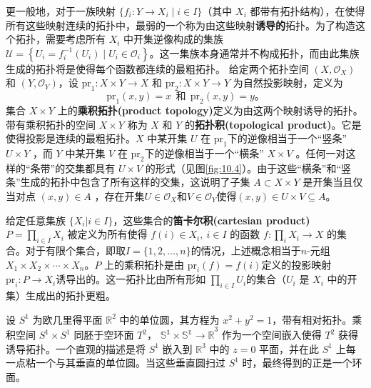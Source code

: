 	更一般地，对于一族映射 $\{f_{i} :Y\rightarrow X_{i} \mid i\in I\}$（其中 $X_{i}$ 都带有拓扑结构），在使得所有这些映射连续的拓扑中，最弱的一个称为由这些映射\textbf{诱导的}拓扑。为了构造这个拓扑，需要考虑所有 $X_{i}$ 中开集逆像构成的集族 $\mathcal{U} =\left\{U_{i} =f_{i}^{-1} (U_{i} )\mid U_{i} \in \mathcal{O}_{i}\right\}$。这一集族本身通常并不构成拓扑，而由此集族生成的拓扑将是使得每个函数都连续的最粗拓扑。
	给定两个拓扑空间 $(X,\mathcal{O}_{X} )$ 和 $(Y,\mathcal{O}_{Y} )$，设 $\mathrm{pr}_{1} :X\times Y\rightarrow X$ 和  $\mathrm{pr}_{2} :X\times Y\rightarrow Y$ 为自然投影映射，定义为
\begin{equation*}
\mathrm{pr}_{1} (x,y)=x\ \ \text{和} \ \ \mathrm{pr}_{2} (x,y)=y。
\end{equation*}
集合 $X\times Y$ 上的\textbf{乘积拓扑(product topology)}定义为由这两个映射诱导的拓扑。带有乘积拓扑的空间 $X\times Y$ 称为 $X$ 和 $Y$ 的\textbf{拓扑积(topological product)}。它是使得投影是连续的最粗拓扑。$X$ 中某开集 $U$ 在 $\mathrm{pr}_{1}$下的逆像相当于一个“竖条” $U\times Y$ ，而 $Y$ 中某开集 $V$ 在 $\mathrm{pr}_{2}$下的逆像相当于一个“横条” $X\times V$ 。任何一对这样的“条带”的交集都具有 $U\times V$ 的形式（见图\ref{fig:10.4}）。由于这些“横条”和“竖条”生成的拓扑中包含了所有这样的交集，这说明了子集 $A\subset X\times Y$ 是开集当且仅当对点 $( x,y) \in A$ ，存在开集$U\in \mathcal{O}_{X}$和$V\in \mathcal{O}_{Y}$使得$( x,y) \in U\times V\subseteq A$。

	给定任意集族 $\{X_{i} |i\in I\}$，这些集合的\textbf{笛卡尔积(cartesian product)} $P=\prod _{i\in I} X_{i}$ 被定义为所有使得 $f(i)\in X_{i} ,\ i\in I$ 的函数 $f:\prod _{i} X_{i}\rightarrow X$ 的集合。对于有限个集合，即取$I=\{1,2,\dotsc ,n\}$的情况，上述概念相当于$n$-元组 $X_{1} \times X_{2} \times \cdots \times X_{n}$。$P$ 上的乘积拓扑是由 $\mathrm{pr}_{i} (f)=f( i)$定义的投影映射$\mathrm{pr}_{i} :P\rightarrow X_{i}$诱导出的。这一拓扑比由所有形如 $\prod _{i\in I} U_{i}$的集合（$U_{i}$ 是 $X_{i}$ 中的开集）生成出的拓扑更粗。

\begin{eg}\label{eg:10.13}
	设 $S^{1}$ 为欧几里得平面 $\mathbb{R}^{2}$ 中的单位圆，其方程为 $x^{2} +y^{2} =1$，带有相对拓扑。乘积空间 $S^{1} \times S^{1}$ 同胚于空环面 $T^{2}$， $\mathbb{S^{1} \times S^{1}\rightarrow R}^{3}$ 作为一个空间嵌入使得 $T^{2}$ 获得诱导拓扑。一个直观的描述是将 $S^{1}$ 嵌入到 $\mathbb{R}^{3}$ 中的 $z=0$ 平面，并在此 $S^{1}$ 上每一点粘一个与其垂直的单位圆。当这些垂直圆扫过 $S^{1}$ 时，最终得到的正是一个环面。
\end{eg}

